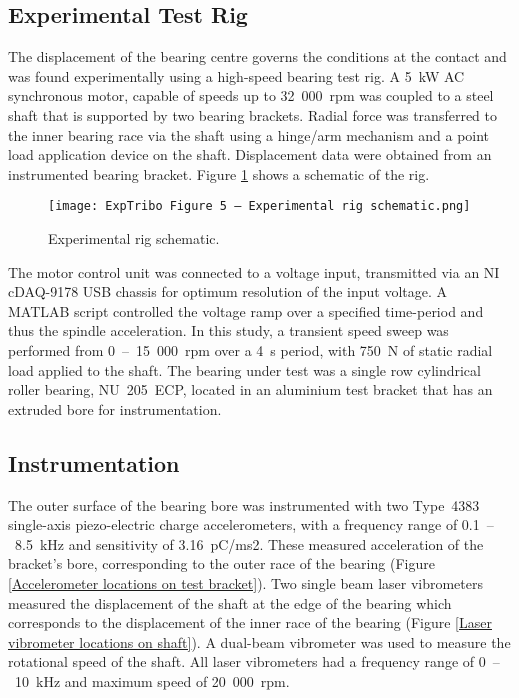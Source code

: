 \subsection{Experimental Test Rig}

The displacement of the bearing centre governs the conditions at the contact and was found experimentally using a high-speed bearing test rig. A 5~kW AC synchronous motor, capable of speeds up to 32~000~rpm was coupled to a steel shaft that is supported by two bearing brackets. Radial force was transferred to the inner bearing race via the shaft using a hinge/arm mechanism and a point load application device on the shaft. Displacement data were obtained from an instrumented bearing bracket. Figure \ref{Experimental rig schematic} shows a schematic of the rig.

\begin{figure}
	\centering
	\texttt{[image: ExpTribo Figure 5 – Experimental rig schematic.png]}
	\caption{Experimental rig schematic.}
	\label{Experimental rig schematic}
\end{figure}

The motor control unit was connected to a voltage input, transmitted via an NI cDAQ-9178 USB chassis for optimum resolution of the input voltage. A MATLAB script controlled the voltage ramp over a specified time-period and thus the spindle acceleration. In this study, a transient speed sweep was performed from 0~–~15~000~rpm over a 4~s period, with 750~N of static radial load applied to the shaft. The bearing under test was a single row cylindrical roller bearing, NU~205~ECP, located in an aluminium test bracket that has an extruded bore for instrumentation.

\subsection{Instrumentation}
The outer surface of the bearing bore was instrumented with two Type~4383 single-axis piezo-electric charge accelerometers, with a frequency range of 0.1~–~8.5~kHz and sensitivity of 3.16~pC/ms2.  These measured acceleration of the bracket’s bore, corresponding to the outer race of the bearing (Figure \ref{Accelerometer locations on test bracket}). Two single beam laser vibrometers measured the displacement of the shaft at the edge of the bearing which corresponds to the displacement of the inner race of the bearing (Figure \ref{Laser vibrometer locations on shaft}). A dual-beam vibrometer was used to measure the rotational speed of the shaft. All laser vibrometers had a frequency range of 0~–~10~kHz and maximum speed of 20~000~rpm.

